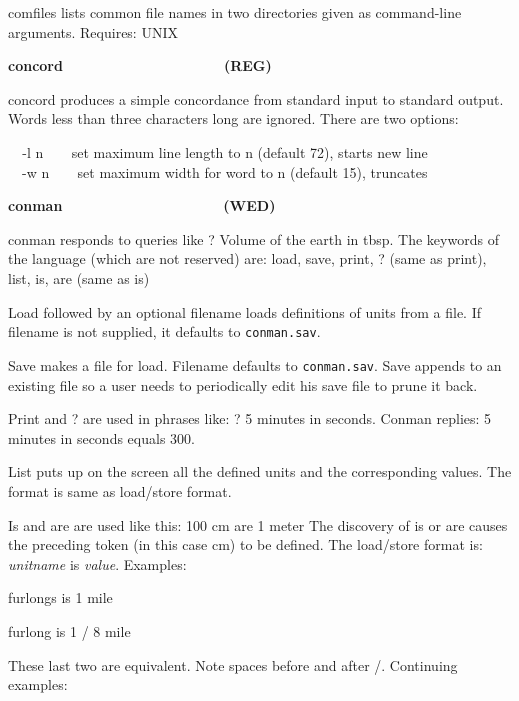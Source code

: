 \textsf{comfiles} lists common file names in two directories given as
command-line arguments. Requires: UNIX 

{\sffamily\bfseries
concord\ \ \ \ \ \ \ \ \ \ \ \ \ \ \ \ \ \ \ \ (REG)}

\textsf{concord} produces a simple concordance from standard input to
standard output. Words less than three characters long are ignored.
There are two options:

\texttt{\ \ }\textsf{{}-l n}\texttt{\ \ }\ \ set maximum line length to
n (default 72), starts new line\\
\ \ \textsf{{}-w n}\texttt{\ \ }\ \ set maximum width for word to n
(default 15), truncates

{\sffamily\bfseries
conman\ \ \ \ \ \ \ \ \ \ \ \ \ \ \ \ \ \ \ \ (WED)}

\textsf{conman} responds to queries like {\textquotedbl}? Volume of the
earth in tbsp{\textquotedbl}. The keywords of the language (which are
not reserved) are: \textsf{load, save, print, ?} (same as print),
\textsf{list, is, are} (same as is)

{\textquotedbl}Load{\textquotedbl} followed by an optional filename
loads definitions of units from a file. If filename is not supplied, it
defaults to \texttt{conman.sav}.

{\textquotedbl}Save{\textquotedbl} makes a file for
{\textquotedbl}load{\textquotedbl}. Filename defaults to
\texttt{conman.sav}. {\textquotedbl}Save{\textquotedbl} appends to an
existing file so a user needs to periodically edit his save file to
prune it back.

{\textquotedbl}Print{\textquotedbl} and {\textquotedbl}?{\textquotedbl}
are used in phrases like: ? 5 minutes in seconds. Conman replies: 5
minutes in seconds equals 300.

List puts up on the screen all the defined units and the corresponding
values. The format is same as load/store format.

{\textquotedbl}Is{\textquotedbl} and {\textquotedbl}are{\textquotedbl}
are used like this: 100 cm are 1 meter The discovery of is or are
causes the preceding token (in this case
{\textquotedbl}cm{\textquotedbl}) to be defined. The load/store format
is: \textit{unitname} {\textquotedbl}is{\textquotedbl} \textit{value}.
Examples:

{ furlongs is 1 mile}

{\sffamily
furlong is 1 / 8 mile }

These last two are equivalent. Note spaces before and after
{\textquotedbl}/{\textquotedbl}. Continuing examples:

